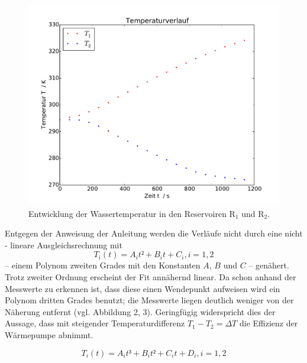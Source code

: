 \begin{figure}
	\includegraphics[width=\textwidth]{Bilder/Temperaturverlauf.pdf}
	\caption{Entwicklung der Wassertemperatur in den Reservoiren $\mathup{R_1}$ und $\mathup{R_2}$.}
	\label{fig:temperaturverlauf}
\end{figure}

Entgegen der Anweisung der Anleitung werden die Verläufe nicht durch eine nicht - lineare Ausgleichsrechnung mit
\begin{equation}
	T_i(t)=A_i t² + B_i t + C_i , i=1,2
	\label{eq:t-verlauf_Grad2}
\end{equation}
 -- einem Polynom zweiten Grades mit den Konstanten $A$, $B$ und $C$ -- genähert. 
Trotz zweiter Ordnung erscheint der Fit annähernd linear. 
Da schon anhand der Messwerte zu erkennen ist, dass diese einen Wendepunkt aufweisen wird ein Polynom dritten Grades benutzt; die Messwerte liegen deutlich weniger von der Näherung entfernt (vgl. Abbildung 2, 3). 
Geringfügig widerspricht dies der Aussage, dass mit steigender Temperaturdifferenz $T_1-T_2=\Delta{T}$ die Effizienz der Wärmepumpe abnimmt.


\begin{equation}
	T_i(t)=A_i t³ + B_i t² + C_i t + D_i , i=1,2
	\label{eq:t-verlauf_Grad3}
\end{equation}

